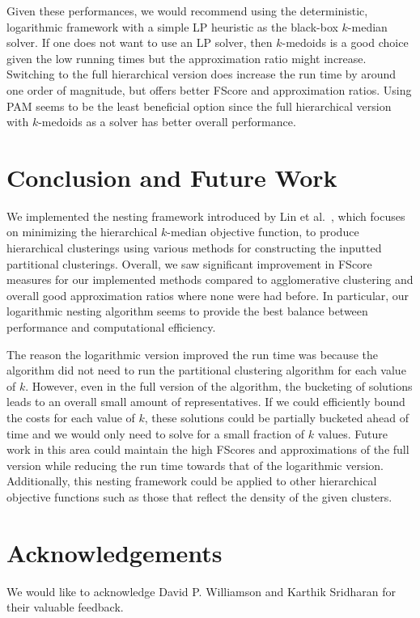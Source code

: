 \documentclass[conference, 10pt, final]{IEEEtran}
\begin{document}
Given these performances, we would recommend using the deterministic, logarithmic framework with a simple LP heuristic as the black-box $k$-median solver. If one does not want to use an LP solver, then $k$-medoids is a good choice given the low running times but the approximation ratio might increase. Switching to the full hierarchical version does increase the run time by around one order of magnitude, but offers better FScore and approximation ratios. Using PAM seems to be the least beneficial option since the full hierarchical version with $k$-medoids as a solver has better overall performance.

\section{Conclusion and Future Work}
We implemented the nesting framework introduced by Lin et al.~\cite{Lin}, which focuses on minimizing the hierarchical $k$-median objective function, to produce hierarchical clusterings using various methods for constructing the inputted partitional clusterings.  Overall, we saw significant improvement in FScore measures for our implemented methods compared to agglomerative clustering and overall good approximation ratios where none were had before. In particular, our logarithmic nesting algorithm seems to provide the best balance between performance and computational efficiency.

The reason the logarithmic version improved the run time was because the algorithm did not need to run the partitional clustering algorithm for each value of $k$. However, even in the full version of the algorithm, the bucketing of solutions leads to an overall small amount of representatives. If we could efficiently bound the costs for each value of $k$, these solutions could be partially bucketed ahead of time and we would only need to solve for a small fraction of $k$ values. Future work in this area could maintain the high FScores and approximations of the full version while reducing the run time towards that of the logarithmic version. Additionally, this nesting framework could be applied to other hierarchical objective functions such as those that reflect the density of the given clusters. 

\section*{Acknowledgements}
We would like to acknowledge David P. Williamson and Karthik Sridharan for their valuable feedback.






\end{document}
